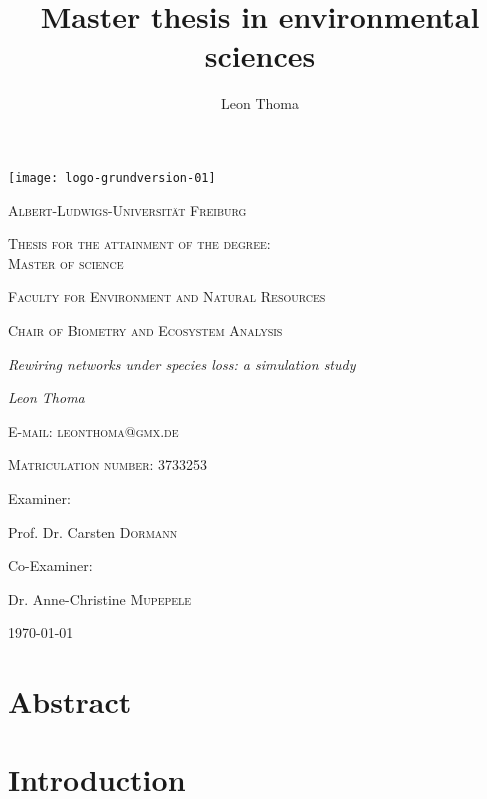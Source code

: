 \documentclass[12pt,a4paper]{article}
\author{Leon Thoma}
\title{Master thesis in environmental sciences}
\begin{document}
\begin{titlepage}
	\centering
	\texttt{[image: logo-grundversion-01]}\par\vspace{1cm}
	{\scshape\large Albert-Ludwigs-Universität Freiburg\par}
	\vspace{1.25cm}
	{\scshape\large Thesis for the attainment of the degree:\\ Master of science\par}
	\vspace{.75cm}
	{\scshape\large Faculty for Environment and Natural Resources\par}
	\vspace{.75cm}
	{\scshape\large Chair of Biometry and Ecosystem Analysis\par}
	\vspace{.75cm}
	{\Large\itshape Rewiring networks under species loss: a simulation
study
\par}
	\vspace{.75cm}
	{\Large\itshape Leon Thoma\par}
	\vspace{.25cm}
	{\scshape\normalsize E-mail: leonthoma@gmx.de\par}
	\vspace{.15cm}
	{\scshape\normalsize Matriculation number: 3733253\par}
	\vspace{.75cm}
	\large Examiner:\par
	\large Prof. Dr. Carsten  \textsc{Dormann} \par
	\vspace{.5cm}
	\large Co-Examiner:\par
	\large Dr. Anne-Christine \textsc{Mupepele}
	\vfill

	{\large \today\par}
\end{titlepage}
	\tableofcontents
	\newpage	
	\section{Abstract} 

\newpage%
%
%
\section{Introduction}
\end{document}
